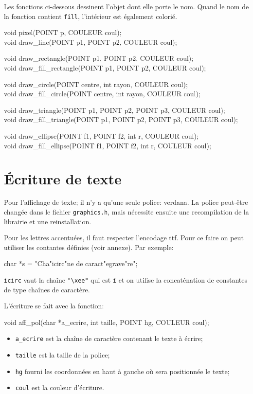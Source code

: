 \documentclass{report}
\newcommand\code[1]{
\begin{mdframed}[linecolor=purple,backgroundcolor=blue!10]
{\tt
#1
}
\end{mdframed}
}
\begin{document}
Les fonctions ci-dessous dessinent l'objet dont elle porte le nom.
Quand le nom de la fonction contient \texttt{fill}, l'intérieur est également
colorié.
\code{
void pixel(POINT p, COULEUR coul);\\
void draw\_line(POINT p1, POINT p2, COULEUR coul);

\vspace{3mm}
\noindent
void draw\_rectangle(POINT p1, POINT p2, COULEUR coul); \\
void draw\_fill\_rectangle(POINT p1, POINT p2, COULEUR coul);

\vspace{3mm}
\noindent
void draw\_circle(POINT centre, int rayon, COULEUR coul);\\
void draw\_fill\_circle(POINT centre, int rayon, COULEUR coul);

\vspace{3mm}
\noindent
void draw\_triangle(POINT p1, POINT p2, POINT p3, COULEUR coul);\\
void draw\_fill\_triangle(POINT p1, POINT p2, POINT p3, COULEUR coul);

\vspace{3mm}
\noindent
void draw\_ellipse(POINT f1, POINT f2, int r, COULEUR coul);\\
void draw\_fill\_ellipse(POINT f1, POINT f2, int r, COULEUR coul);
}


\section{Écriture de texte}
Pour l'affichage de texte; il n'y a qu'une seule police: verdana.
La police peut-être changée dans le fichier \texttt{graphics.h},
mais nécessite ensuite une recompilation de la librairie et une reinstallation.

Pour les lettres accentuées, il faut respecter l'encodage ttf.
Pour ce faire on peut utiliser les contantes définies (voir annexe).
Par exemple:
\code{
char *s = "Cha"icirc"ne de caract"egrave"re";
}
\texttt{icirc} vaut la chaîne \texttt{"\textbackslash xee"} qui est \texttt{î} et on utilise la concaténation
de constantes de type chaînes de caractère.

L'écriture se fait avec la fonction:
\code{
void aff\_pol(char *a\_ecrire, int taille, POINT hg, COULEUR coul);
}
\begin{itemize}
\item \texttt{a\_ecrire} est la chaîne de caractère contenant le texte à écrire;
\item \texttt{taille} est la taille de la police;
\item \texttt{hg} fourni les coordonnées en haut à gauche où sera positionnée le texte;
\item \texttt{coul} est la couleur d'écriture.
\end{itemize}
\end{document}
